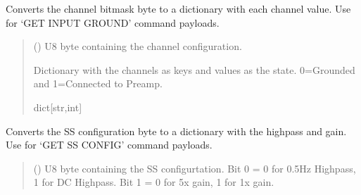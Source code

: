 \documentclass[letterpaper,10pt,english]{sphinxmanual}
\begin{document}
\begin{fulllineitems}
\begin{fulllineitems}
\label{\detokenize{PodApi.Devices:PodApi.Devices.PodDevice_8401HR.Pod8401HR.DecodeChannelBitmask}}
\pysigstartsignatures
{}
\pysigstopsignatures
\sphinxAtStartPar
Converts the channel bitmask byte to a dictionary with each channel value.         Use for ‘GET INPUT GROUND’ command payloads.
\begin{quote}\begin{description}
\sphinxAtStartPar
{} () \textendash{} U8 byte containing the channel configuration.

\sphinxAtStartPar
Dictionary with the channels as keys and values as the state.                 0=Grounded and 1=Connected to Preamp.

\sphinxAtStartPar
dict{[}str,int{]}

\end{description}\end{quote}

\end{fulllineitems}


\begin{fulllineitems}
\label{\detokenize{PodApi.Devices:PodApi.Devices.PodDevice_8401HR.Pod8401HR.DecodeSSConfigBitmask}}
\pysigstartsignatures
{}
\pysigstopsignatures
\sphinxAtStartPar
Converts the SS configuration byte to a dictionary with the high\sphinxhyphen{}pass and gain.         Use for ‘GET SS CONFIG’ command payloads.
\begin{quote}\begin{description}
\sphinxAtStartPar
{} () \textendash{} U8 byte containing the SS configurtation. Bit 0 = 0 for 0.5Hz Highpass,                 1 for DC Highpass. Bit 1 = 0 for 5x gain, 1 for 1x gain.


\end{description}
\end{quote}
\end{fulllineitems}
\end{fulllineitems}
\end{document}
